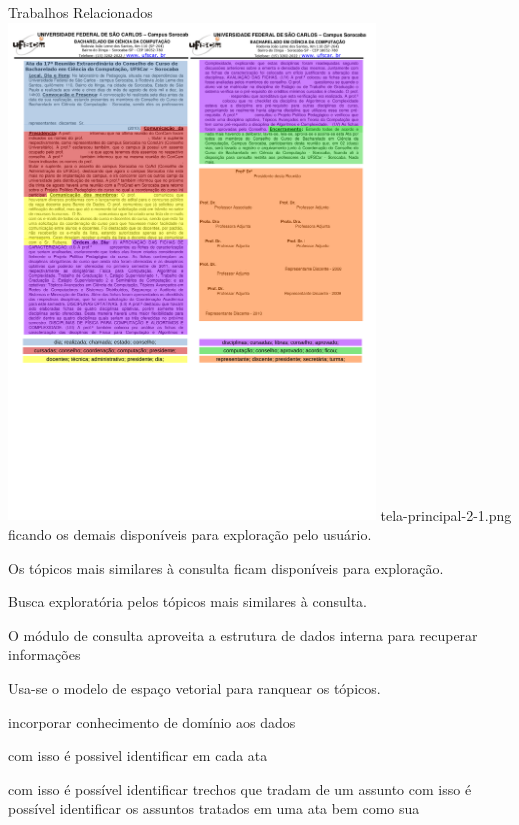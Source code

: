 \begin{frame}{Trabalhos Relacionados}
		\includegraphics[trim={ 0 235 0 16 },clip,page=1,width=0.73\textwidth]{images/distribuicao.pdf}
tela-principal-2-1.png
ficando os demais disponíveis para exploração pelo usuário.

Os tópicos mais similares à consulta ficam disponíveis para exploração.


Busca exploratória pelos tópicos mais similares à consulta.







O módulo de consulta aproveita a estrutura de dados interna para recuperar informações

Usa-se o modelo de espaço vetorial para ranquear os tópicos.








incorporar conhecimento de domínio aos dados












com isso é possivel identificar em cada ata

com isso é possível identificar trechos que tradam de um assunto
com isso é possível identificar os assuntos tratados em uma ata bem como sua 


\end{frame}
